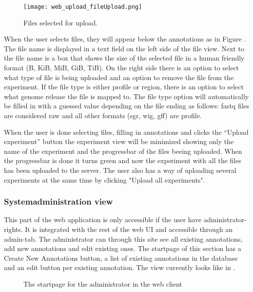 \begin{figure}[h]
\centering
\texttt{[image: web\_upload\_fileUpload.png]}
\caption{\label{fig:web_upload_fileUpload}Files selected for upload.}
\end{figure}
 
When the user selects files, they will appear below the annotations as in Figure . The file name is displayed in a text field on the left side of the file view. Next to the file name is a box that shows the size of the selected file in a human friendly format (B, KiB, MiB, GiB, TiB). On the right side there is an option to select what type of file is being uploaded and an option to remove the file from the experiment. If the file type is either profile or region, there is an option to select what genome release the file is mapped to. The file type option will automatically be filled in with a guessed value depending on the file ending as follows: fastq files are considered raw and all other formats (sgr, wig, gff) are profile.

When the user is done selecting files, filling in annotations and clicks the “Upload experiment” button the experiment view will be minimized showing only the name of the experiment and the progressbar of the files beeing uploaded. When the progressbar is done it turns green and now the experiment with all the files has been uploaded to the server. The user also has a way of uploading several experiments at the same time by clicking "Upload all experiments".

\subsubsection{Systemadministration view}

This part of the web application is only accessible if the user have administrator-rights. It is integrated with the rest of the web UI and accessible through an admin-tab. The administrator can through this site see all existing annotations, add new annotations and edit existing ones.
The startpage of this section has a Create New Annotations button, a list of existing annotations in the database and an edit button per existing annotation. 
The view currently looks like in . 

\begin{figure}[h]
 \caption{The startpage for the administrator in the web client}
 \label{adm__web_annotationView}
\end{figure}

